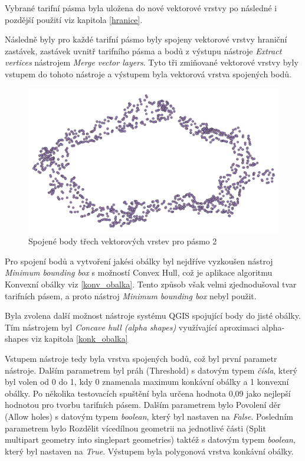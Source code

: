 Vybrané tarifní pásma byla uložena do nové vektorové vrstvy po následné i pozdější použití viz kapitola \ref{hranice}.

Následně byly pro každé tarifní pásmo byly spojeny vektorové vrstvy hraniční zastávek, 
zastávek uvnitř tarifního pásma a bodů z výstupu nástroje \textit{Extract vertices} nástrojem \textit{Merge vector layers}.
Tyto tři zmiňované vektorové vrstvy byly vstupem do tohoto nástroje a výstupem byla 
vektorová vrstva spojených bodů. 

\begin{figure}[H] \centering
    \includegraphics[width=400pt]{./pictures/merged.png}
    \caption[Spojené body třech vektorových vrstev pro pásmo 2]{Spojené body třech vektorových vrstev pro pásmo 2}
	\label{fig:merged}              
\end{figure} 

Pro spojení bodů a vytvoření jakési obálky byl nejdříve vyzkoušen nástroj \textit{Minimum bounding box} s možností Convex Hull,
což je aplikace algoritmu Konvexní obálky viz \ref{konv_obalka}. Tento způsob však velmi zjednodušoval tvar
tarifních pásem, a proto nástroj \textit{Minimum bounding box} nebyl použit.

Byla zvolena další možnost nástroje systému QGIS spojující body do jisté obálky. Tím nástrojem byl \textit{Concave hull (alpha shapes)} 
využívající aproximaci alpha-shapes viz kapitola \ref{konk_obalka}

Vstupem nástroje tedy byla vrstva spojených bodů, což byl první parametr
nástroje. Dalším parametrem byl práh (Threshold) s datovým typem \textit{čísla}, který byl volen od 0 do 1,
kdy 0 znamenala maximum konkávní obálky a 1 konvexní obálky. Po několika testovacích spuštění byla 
určena hodnota 0,09 jako nejlepší hodnotou pro tvorbu tarifních pásem. Dalším parametrem bylo Povolení děr (Allow holes) 
s datovým typem \textit{boolean}, který byl nastaven na \textit{False}.
Posledním parametrem bylo Rozdělit vícedílnou geometrii na jednotlivé části (Split multipart geometry 
into singlepart geometries) taktéž s datovým typem \textit{boolean}, který byl nastaven na \textit{True}.  
Výstupem byla polygonová vrstva konkávní obálky. 

